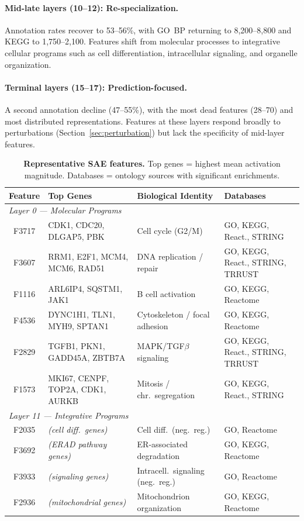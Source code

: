 \documentclass[onecolumn]{article}
\begin{document}
\paragraph{Mid-late layers (10--12): Re-specialization.} Annotation rates recover to 53--56\%, with GO~BP returning to 8,200--8,800 and KEGG to 1,750--2,100. Features shift from molecular processes to integrative cellular programs such as cell differentiation, intracellular signaling, and organelle organization.

\paragraph{Terminal layers (15--17): Prediction-focused.} A second annotation decline (47--55\%), with the most dead features (28--70) and most distributed representations. Features at these layers respond broadly to perturbations (Section~\ref{sec:perturbation}) but lack the specificity of mid-layer features.

\begin{table}[t]
\centering
\caption{\textbf{Representative SAE features.} Top genes = highest mean activation magnitude. Databases = ontology sources with significant enrichments.}
\label{tab:examples}
\smallskip
\small
\begin{tabular}{cp{3.8cm}p{3.5cm}l}
\toprule
Feature & Top Genes & Biological Identity & Databases \\
\midrule
\multicolumn{4}{l}{\textit{Layer 0 --- Molecular Programs}} \\
F3717 & CDK1, CDC20, DLGAP5, PBK & Cell cycle (G2/M) & GO, KEGG, React., STRING \\
F3607 & RRM1, E2F1, MCM4, MCM6, RAD51 & DNA replication / repair & GO, KEGG, React., STRING, TRRUST \\
F1116 & ARL6IP4, SQSTM1, JAK1 & B cell activation & GO, KEGG, Reactome \\
F4536 & DYNC1H1, TLN1, MYH9, SPTAN1 & Cytoskeleton / focal adhesion & GO, KEGG, Reactome \\
F2829 & TGFB1, PKN1, GADD45A, ZBTB7A & MAPK/TGF$\beta$ signaling & GO, KEGG, React., STRING, TRRUST \\
F1573 & MKI67, CENPF, TOP2A, CDK1, AURKB & Mitosis / chr.\ segregation & GO, KEGG, React., STRING \\
\midrule
\multicolumn{4}{l}{\textit{Layer 11 --- Integrative Programs}} \\
F2035 & \textit{(cell diff.\ genes)} & Cell diff.\ (neg.\ reg.) & GO, Reactome \\
F3692 & \textit{(ERAD pathway genes)} & ER-associated degradation & GO, KEGG, Reactome \\
F3933 & \textit{(signaling genes)} & Intracell.\ signaling (neg.\ reg.) & GO, Reactome \\
F2936 & \textit{(mitochondrial genes)} & Mitochondrion organization & GO, KEGG, Reactome \\
\bottomrule
\end{tabular}
\end{table}
\end{document}
